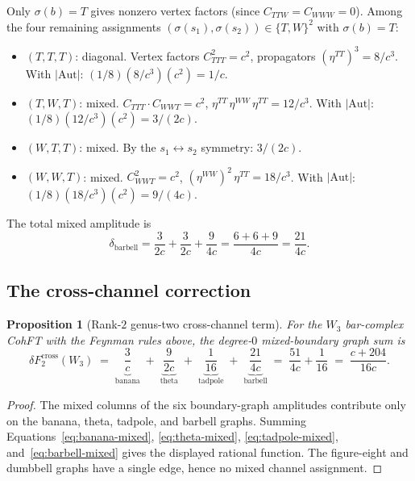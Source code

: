 \documentclass[11pt]{article}
\theoremstyle{plain}
\newtheorem{proposition}[theorem]{Proposition}
\theoremstyle{definition}
\theoremstyle{remark}
\begin{document}
Only $\sigma(b) = T$ gives nonzero vertex factors
(since $C_{TTW} = C_{WWW} = 0$). Among the four remaining
assignments $(\sigma(s_1), \sigma(s_2)) \in \{T,W\}^2$ with
$\sigma(b) = T$:
\begin{itemize}
\item \emph{$(T,T,T)$}: diagonal.
 Vertex factors $C_{TTT}^2 = c^2$,
 propagators $(\eta^{TT})^3 = 8/c^3$.
 With $|\mathrm{Aut}|$: $(1/8)(8/c^3)(c^2) = 1/c$.

\item \emph{$(T,W,T)$}: mixed.
 $C_{TTT} \cdot C_{WWT} = c^2$,
 $\eta^{TT}\,\eta^{WW}\,\eta^{TT} = 12/c^3$.
 With $|\mathrm{Aut}|$:
 $(1/8)(12/c^3)(c^2) = 3/(2c)$.

\item \emph{$(W,T,T)$}: mixed. By the $s_1 \leftrightarrow s_2$
 symmetry: $3/(2c)$.

\item \emph{$(W,W,T)$}: mixed.
 $C_{WWT}^2 = c^2$,
 $(\eta^{WW})^2\,\eta^{TT} = 18/c^3$.
 With $|\mathrm{Aut}|$:
 $(1/8)(18/c^3)(c^2) = 9/(4c)$.
\end{itemize}
The total mixed amplitude is
\begin{equation}\label{eq:barbell-mixed}
\delta_{\mathrm{barbell}}
= \frac{3}{2c} + \frac{3}{2c} + \frac{9}{4c}
= \frac{6 + 6 + 9}{4c}
= \frac{21}{4c}.
\end{equation}


\subsection{The cross-channel correction}
\label{subsec:cross-channel}

\begin{proposition}[Rank-$2$ genus-two cross-channel term]
\label{prop:w3-cross-channel}
For the $W_3$ bar-complex CohFT with the Feynman rules above, the
degree-$0$ mixed-boundary graph sum is
\begin{equation}\label{eq:cross-channel-total}
\delta F_2^{\mathrm{cross}}(W_3)
\;=\;
\underbrace{\frac{3}{c}}_{\text{banana}}
\;+\;
\underbrace{\frac{9}{2c}}_{\text{theta}}
\;+\;
\underbrace{\frac{1}{16}}_{\text{tadpole}}
\;+\;
\underbrace{\frac{21}{4c}}_{\text{barbell}}
\;=\;
\frac{51}{4c} + \frac{1}{16}
\;=\;
\frac{c + 204}{16c}.
\end{equation}
\end{proposition}

\begin{proof}
The mixed columns of the six boundary-graph amplitudes contribute
only on the banana, theta, tadpole, and barbell graphs. Summing
Equations~\eqref{eq:banana-mixed}, \eqref{eq:theta-mixed},
\eqref{eq:tadpole-mixed}, and~\eqref{eq:barbell-mixed} gives the
displayed rational function. The figure-eight and dumbbell graphs
have a single edge, hence no mixed channel assignment.
\end{proof}
\end{document}
